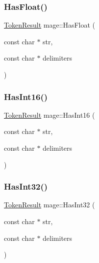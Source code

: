 \hypertarget{namespacemage_a8ebb1c7757b2869a4d3dc3c60c3a836d}{}\label{namespacemage_a8ebb1c7757b2869a4d3dc3c60c3a836d} 
\subsubsection{\texorpdfstring{Has\+Float()}{HasFloat()}}
{\footnotesize\ttfamily \hyperlink{namespacemage_a2178ba2411db5912f41b2e7698c2037d}{Token\+Result} mage\+::\+Has\+Float (\begin{DoxyParamCaption}\item[{const char $\ast$}]{str,  }\item[{const char $\ast$}]{delimiters }\end{DoxyParamCaption})}

\hypertarget{namespacemage_acb619a437a47ef3212c2fc71fdfa33b6}{}\label{namespacemage_acb619a437a47ef3212c2fc71fdfa33b6} 
\subsubsection{\texorpdfstring{Has\+Int16()}{HasInt16()}}
{\footnotesize\ttfamily \hyperlink{namespacemage_a2178ba2411db5912f41b2e7698c2037d}{Token\+Result} mage\+::\+Has\+Int16 (\begin{DoxyParamCaption}\item[{const char $\ast$}]{str,  }\item[{const char $\ast$}]{delimiters }\end{DoxyParamCaption})}

\hypertarget{namespacemage_a78f76aec12a47505136e00224e4bf9ce}{}\label{namespacemage_a78f76aec12a47505136e00224e4bf9ce} 
\subsubsection{\texorpdfstring{Has\+Int32()}{HasInt32()}}
{\footnotesize\ttfamily \hyperlink{namespacemage_a2178ba2411db5912f41b2e7698c2037d}{Token\+Result} mage\+::\+Has\+Int32 (\begin{DoxyParamCaption}\item[{const char $\ast$}]{str,  }\item[{const char $\ast$}]{delimiters }\end{DoxyParamCaption})}

